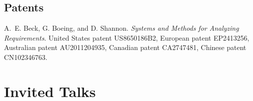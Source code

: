 \documentclass[11pt,letterpaper]{report} %
\begin{document}
\subsection*{Patents}

\begin{tablist}

\item[2014] \tab{}A.~E. Beck, G. Boeing, and D. Shannon. \textit{Systems and Methods for Analyzing Requirements}. United States patent US8650186B2, European patent EP2413256, Australian patent AU2011204935, Canadian patent CA2747481, Chinese patent CN102346763.

\end{tablist}

\section*{Invited Talks}
\end{document}
